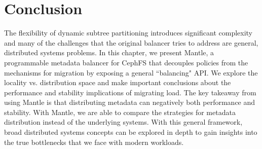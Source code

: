 \section{Conclusion}
The flexibility of dynamic subtree partitioning introduces significant complexity and many of the challenges that the original balancer tries to address are general, distributed systems problems. In this chapter, we present Mantle, a programmable metadata balancer for CephFS that decouples policies from the mechanisms for migration by exposing a general ``balancing" API. We explore the locality vs. distribution space and make important conclusions about the performance and stability implications of migrating load. The key takeaway from using Mantle is that distributing metadata can negatively both performance and stability. With Mantle, we are able to compare the strategies for metadata distribution instead of the underlying systems. With this general framework, broad distributed systems concepts can be explored in depth to gain insights into the true bottlenecks that we face with modern workloads. 
